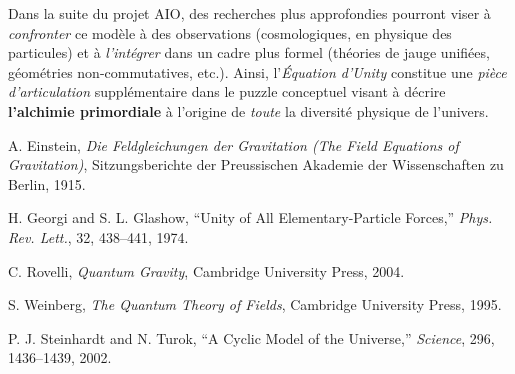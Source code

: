 \documentclass[12pt]{article}
\begin{document}
Dans la suite du projet AIO, des recherches plus approfondies pourront viser 
à \emph{confronter} ce modèle à des observations (cosmologiques, en physique des particules) 
et à \emph{l’intégrer} dans un cadre plus formel (théories de jauge unifiées, 
géométries non-commutatives, etc.). Ainsi, l’\emph{Équation d’Unity} constitue 
une \emph{pièce d’articulation} supplémentaire dans le puzzle conceptuel 
visant à décrire \textbf{l’alchimie primordiale} à l’origine de \emph{toute} la diversité 
physique de l’univers.

\vspace{0.5cm}

\begin{thebibliography}{9}

A. Einstein,
\textit{Die Feldgleichungen der Gravitation (The Field Equations of Gravitation)}, 
Sitzungsberichte der Preussischen Akademie der Wissenschaften zu Berlin, 1915.

H. Georgi and S. L. Glashow,
``Unity of All Elementary-Particle Forces,''
\textit{Phys. Rev. Lett.}, 32, 438--441, 1974.

C. Rovelli, 
\textit{Quantum Gravity}, 
Cambridge University Press, 2004.

S. Weinberg, 
\textit{The Quantum Theory of Fields}, 
Cambridge University Press, 1995.

P. J. Steinhardt and N. Turok,
``A Cyclic Model of the Universe,''
\textit{Science}, 296, 1436--1439, 2002.

\end{thebibliography}
\end{document}

